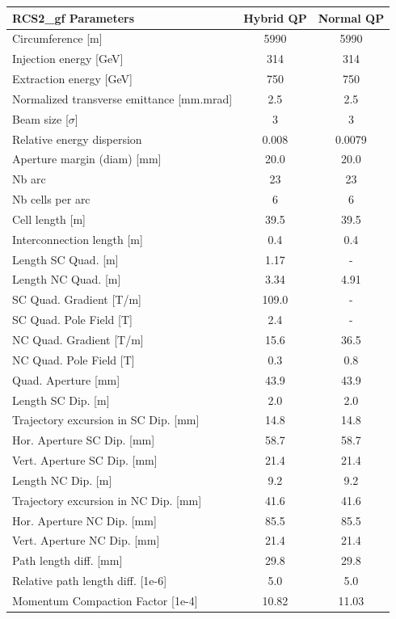 \begin{tabular}{lcc}
\toprule
RCS2_gf Parameters & Hybrid QP & Normal QP \\
\midrule
Circumference [m] & 5990 & 5990 \\
Injection energy [GeV] & 314 & 314 \\
Extraction energy [GeV] & 750 & 750 \\
Normalized transverse emittance [mm.mrad] & 2.5 & 2.5 \\
Beam size [$\sigma$] & 3 & 3 \\
Relative energy dispersion & 0.008 & 0.0079 \\
Aperture margin (diam) [mm] & 20.0 & 20.0 \\
Nb arc & 23 & 23 \\
Nb cells per arc & 6 & 6 \\
Cell length [m] & 39.5 & 39.5 \\
Interconnection length [m] & 0.4 & 0.4 \\
Length SC Quad. [m] & 1.17 & - \\
Length NC Quad. [m] & 3.34 & 4.91 \\
SC Quad. Gradient [T/m] & 109.0 & - \\
SC Quad. Pole Field [T] & 2.4 & - \\
NC Quad. Gradient [T/m] & 15.6 & 36.5 \\
NC Quad. Pole Field [T] & 0.3 & 0.8 \\
Quad. Aperture [mm] & 43.9 & 43.9 \\
Length SC Dip. [m] & 2.0 & 2.0 \\
Trajectory excursion in SC Dip. [mm] & 14.8 & 14.8 \\
Hor. Aperture SC Dip. [mm] & 58.7 & 58.7 \\
Vert. Aperture SC Dip. [mm] & 21.4 & 21.4 \\
Length NC Dip. [m] & 9.2 & 9.2 \\
Trajectory excursion in NC Dip. [mm] & 41.6 & 41.6 \\
Hor. Aperture NC Dip. [mm] & 85.5 & 85.5 \\
Vert. Aperture NC Dip. [mm] & 21.4 & 21.4 \\
Path length diff. [mm] & 29.8 & 29.8 \\
Relative path length diff. [1e-6] & 5.0 & 5.0 \\
Momentum Compaction Factor [1e-4] & 10.82 & 11.03 \\
\bottomrule
\end{tabular}
